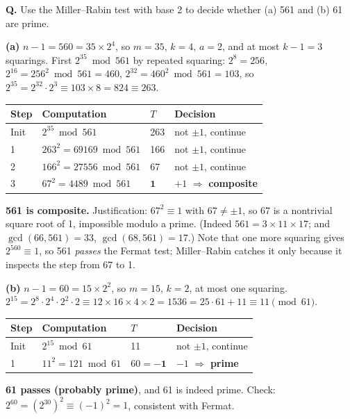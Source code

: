 \begin{worked}
\textbf{Q.} Use the Miller--Rabin test with base 2 to decide whether (a) 561 and (b) 61 are prime.

\textbf{(a)} $n - 1 = 560 = 35 \times 2^4$, so $m = 35$, $k = 4$, $a = 2$, and at most $k - 1 = 3$ squarings.
First $2^{35} \bmod 561$ by repeated squaring: $2^8 = 256$, $2^{16} = 256^2 \bmod 561 = 460$, $2^{32} = 460^2 \bmod 561 = 103$, so $2^{35} = 2^{32} \cdot 2^3 \equiv 103 \times 8 = 824 \equiv 263$.
\begin{center}\small
\begin{tabular}{@{}llll@{}}
\toprule
Step & Computation & $T$ & Decision\\
\midrule
Init & $2^{35} \bmod 561$ & 263 & not $\pm1$, continue\\
1 & $263^2 = 69169 \bmod 561$ & 166 & not $\pm1$, continue\\
2 & $166^2 = 27556 \bmod 561$ & 67 & not $\pm1$, continue\\
3 & $67^2 = 4489 \bmod 561$ & $\mathbf{1}$ & $+1$ $\Rightarrow$ \textbf{composite}\\
\bottomrule
\end{tabular}
\end{center}
\textbf{561 is composite.} Justification: $67^2 \equiv 1$ with $67 \ne \pm1$, so 67 is a nontrivial square root of 1, impossible modulo a prime. (Indeed $561 = 3 \times 11 \times 17$; and $\gcd(66, 561) = 33$, $\gcd(68, 561) = 17$.) Note that one more squaring gives $2^{560} \equiv 1$, so 561 \emph{passes} the Fermat test; Miller--Rabin catches it only because it inspects the step from 67 to 1.

\medskip
\textbf{(b)} $n - 1 = 60 = 15 \times 2^2$, so $m = 15$, $k = 2$, at most one squaring. $2^{15} = 2^8 \cdot 2^4 \cdot 2^2 \cdot 2 \equiv 12 \times 16 \times 4 \times 2 = 1536 = 25 \cdot 61 + 11 \equiv 11 \pmod{61}$.
\begin{center}\small
\begin{tabular}{@{}llll@{}}
\toprule
Step & Computation & $T$ & Decision\\
\midrule
Init & $2^{15} \bmod 61$ & 11 & not $\pm1$, continue\\
1 & $11^2 = 121 \bmod 61$ & $60 = \mathbf{-1}$ & $-1$ $\Rightarrow$ \textbf{prime}\\
\bottomrule
\end{tabular}
\end{center}
\textbf{61 passes (probably prime)}, and 61 is indeed prime. Check: $2^{60} = (2^{30})^2 \equiv (-1)^2 = 1$, consistent with Fermat.
\end{worked}

